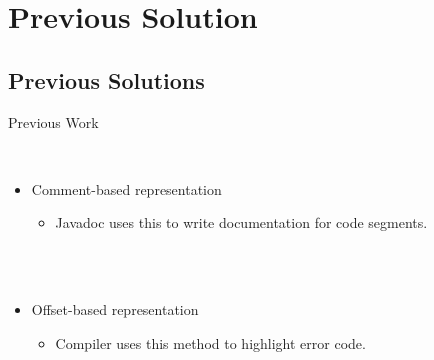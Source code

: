 \documentclass[]{beamer}
\begin{document}
\section{Previous Solution}
\subsection{Previous Solutions}
\begin{frame}{\centerline{Previous Work}}
  \ \\
  \fontsize{13.5}{11}\selectfont
  \begin{itemize}
  \item Comment-based representation
    \begin{itemize}
      \item Javadoc uses this to write documentation for code segments.
    \end{itemize}
  \ \\
  \ \\
  \item Offset-based representation
    \begin{itemize}
      \item Compiler uses this method to highlight error code.
    \end{itemize}
  \end{itemize}
\end{frame}
\end{document}
